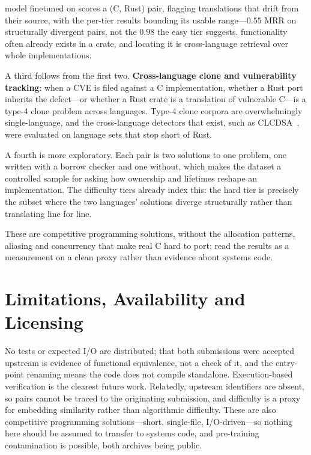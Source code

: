  model
finetuned on \dsname{} scores a (C, Rust) pair, flagging translations that
drift from their source, with the per-tier results bounding its usable
range---$0.55$ MRR on structurally divergent pairs, not the $0.98$ the easy
tier suggests.  functionality
often already exists in a crate, and locating it is cross-language retrieval
over whole implementations.

\ifextended
A third follows from the first two. \textbf{Cross-language clone and
vulnerability tracking}: when a CVE is filed against a C implementation,
whether a Rust port inherits the defect---or whether a Rust crate is a
translation of vulnerable C---is a type-4 clone problem across languages.
Type-4 clone corpora are overwhelmingly single-language, and the cross-language
detectors that exist, such as CLCDSA~\cite{nafi2019clcdsa}, were evaluated on
language sets that stop short of Rust.

A fourth is more exploratory. Each pair is two solutions to one problem, one
written with a borrow checker and one without, which makes the dataset a
controlled sample for asking how ownership and lifetimes reshape an
implementation. The difficulty tiers already index this: the hard tier is
precisely the subset where the two languages' solutions diverge structurally
rather than translating line for line.
\fi

These are competitive programming solutions, without the allocation patterns,
aliasing and concurrency that make real C hard to port; read the results as a
measurement on a clean proxy rather than evidence about systems code.

\section{Limitations, Availability and Licensing}
\label{sec:limitations}
\label{sec:availability}

 No tests or expected I/O are
distributed; that both submissions were accepted upstream is evidence of
functional equivalence, not a check of it, and the entry-point renaming means
the code does not compile standalone. Execution-based verification is the
clearest future work. Relatedly, upstream identifiers are absent, so pairs
cannot be traced to the originating submission, and difficulty is a proxy for
embedding similarity rather than algorithmic difficulty. These are also
competitive programming solutions---short, single-file, I/O-driven---so nothing
here should be assumed to transfer to systems code, and pre-training
contamination is possible, both archives being public.

